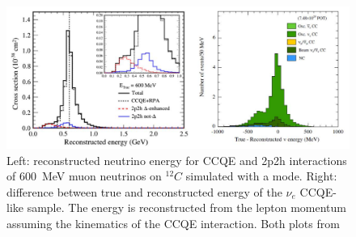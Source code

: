 %
\begin{figure}[tbhp]
\begin{center}
\includegraphics[width=\linewidth]{fig/recE.pdf}
\end{center}
\caption{Left: reconstructed neutrino energy for CCQE and 2p2h interactions of 600~MeV muon neutrinos on $^{12}C$ simulated with a mode.
  Right: difference between true and reconstructed energy of the $\nu_e$ CCQE-like sample.
  The energy is reconstructed from the lepton momentum assuming the kinematics of the CCQE interaction.
  Both plots from \cite{Abe:2017vifw}
}
\label{fig:ene_rec_bias}
\end{figure}
%
